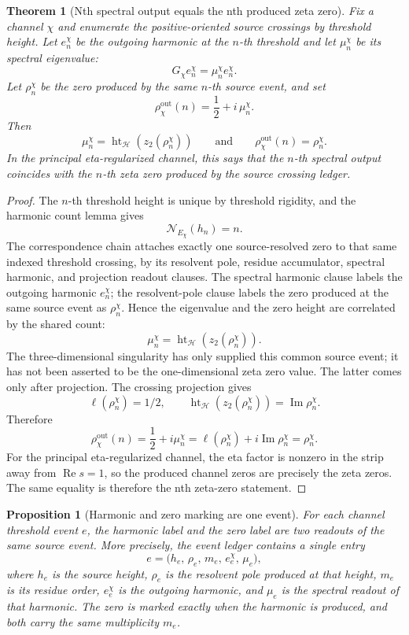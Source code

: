 \documentclass[11pt]{article}
\newtheorem{theorem}[definition]{Theorem}
\newtheorem{proposition}[definition]{Proposition}
\DeclareMathOperator{\Ree}{Re}
\DeclareMathOperator{\Imm}{Im}
\DeclareMathOperator{\hgt}{ht}
\begin{document}
\begin{theorem}[Nth spectral output equals the nth produced zeta zero]
Fix a channel $\chi$ and enumerate the positive-oriented source crossings by
threshold height.  Let $e_n^\chi$ be the outgoing harmonic at the $n$-th
threshold and let $\mu_n^\chi$ be its spectral eigenvalue:
\[
  G_\chi e_n^\chi=\mu_n^\chi e_n^\chi .
\]
Let $\rho_n^\chi$ be the zero produced by the same $n$-th source event, and set
\[
  \rho^{\mathrm{out}}_\chi(n)=\frac12+i\,\mu_n^\chi .
\]
Then
\[
  \mu_n^\chi=\hgt_{\mathcal H}(z_2(\rho_n^\chi))
  \qquad\text{and}\qquad
  \rho^{\mathrm{out}}_\chi(n)=\rho_n^\chi .
\]
In the principal eta-regularized channel, this says that the $n$-th spectral
output coincides with the $n$-th zeta zero produced by the source crossing
ledger.
\end{theorem}

\begin{proof}
The $n$-th threshold height is unique by threshold rigidity, and the harmonic
count lemma gives
\[
  \mathcal N_{E_\chi}(h_n)=n .
\]
The correspondence chain attaches exactly one source-resolved zero to that
same indexed threshold crossing, by its resolvent pole, residue accumulator,
spectral harmonic, and projection readout clauses.  The spectral harmonic
clause labels the outgoing harmonic $e_n^\chi$; the resolvent-pole clause labels
the zero produced at the same source event as $\rho_n^\chi$.  Hence the
eigenvalue and the zero height are correlated by the shared count:
\[
  \mu_n^\chi=\hgt_{\mathcal H}(z_2(\rho_n^\chi)).
\]
The three-dimensional singularity has only supplied this common source event;
it has not been asserted to be the one-dimensional zeta zero value.  The latter
comes only after projection.  The crossing projection gives
\[
  \ell(\rho_n^\chi)=1/2,
  \qquad
  \hgt_{\mathcal H}(z_2(\rho_n^\chi))=\Imm\rho_n^\chi .
\]
Therefore
\[
  \rho^{\mathrm{out}}_\chi(n)
   =\frac12+i\mu_n^\chi
   =\ell(\rho_n^\chi)+i\Imm\rho_n^\chi
   =\rho_n^\chi .
\]
For the principal eta-regularized channel, the eta factor is nonzero in the
strip away from $\Ree s=1$, so the produced channel zeros are precisely the
zeta zeros.  The same equality is therefore the nth zeta-zero statement.
\end{proof}

\begin{proposition}[Harmonic and zero marking are one event]
For each channel threshold event $e$, the harmonic label and the zero label are
two readouts of the same source event.  More precisely, the event ledger
contains a single entry
\[
  e
  =
  \bigl(
    h_e,\,
    \rho_e,\,
    m_e,\,
    e^\chi_e,\,
    \mu_e
  \bigr),
\]
where $h_e$ is the source height, $\rho_e$ is the resolvent pole produced at
that height, $m_e$ is its residue order, $e^\chi_e$ is the outgoing harmonic,
and $\mu_e$ is the spectral readout of that harmonic.  The zero is marked
exactly when the harmonic is produced, and both carry the same multiplicity
$m_e$.
\end{proposition}
\end{document}
